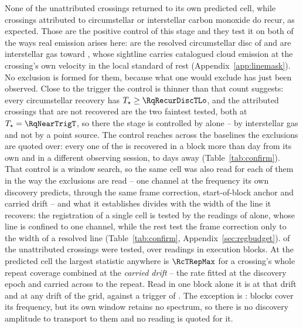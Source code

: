 None of the unattributed crossings returned to its own predicted cell, while
\MkAttrRecur{} crossings attributed to circumstellar or interstellar carbon
monoxide do recur, as expected. Those \MkAttrRecur{} are the positive control of this stage and they
test it on both of the ways real emission arises here: \RqNRecurDisc{} are the
resolved circumstellar disc of \RqRecurDiscStars{} and \RqNRecurCloud{} are
interstellar gas toward \RqRecurCloudStars, whose sightline carries catalogued
cloud emission at the crossing's own velocity in the local standard of rest
(Appendix~\ref{app:linemask}). No exclusion is formed for them, because what
one would exclude has just been observed. Close to the trigger the control is
thinner than that count suggests: every circumstellar recovery has
$T_\star\ge\RqRecurDiscTLo$, and the \RqNearTrigN{} attributed crossings that
are not recovered are the two faintest tested, both at
$T_\star=\RqNearTrigT$, so there the stage is controlled by
\RqRecurCloudStars{} alone -- by interstellar gas and not by a point
source. The control reaches across the baselines the exclusions are quoted
over: every one of the \QcNCtl{} is recovered in a block more than \EpSep{}
day from its own and in a different observing session, \QcSepMinD{} to
\QcSepMaxD{} days away (Table~\ref{tab:confirm}).
That control is a window search, so the same cell was also read for each of
them in the way the exclusions are read -- one channel at the frequency its
own discovery predicts, through the same frame correction, start-of-block
anchor and carried drift -- and what it establishes divides with the width of
the line it recovers: the registration of a single cell is tested by the
\RgRegNUnres{} readings of \RgRegStar{} alone, whose line is confined to one
channel, while the rest test the frame correction only to the width of a
resolved line (Table~\ref{tab:confirm}, Appendix~\ref{sec:regbudget}). \RcNExclPoss{} of the \RcNTested{} unattributed crossings were tested,
over \RcNRepeatMeas{} readings in \RcNRepeatBlock{} execution blocks. At the
predicted cell the largest statistic anywhere is $\RcTRepMax$ for a crossing's
whole repeat coverage combined at the \emph{carried drift} -- the rate fitted
at the discovery epoch and carried across to the repeat. Read in one block
alone it is \RcTMatched{} at that drift and \RcTMax{} at any drift of the
grid, against a trigger of \StageNullTrig. The exception is \RcUntStar{} \texttt{\RcUntEb}:
\RcUntNRep{} blocks cover its frequency, but its own window retains no
spectrum, so there is no discovery amplitude to transport to them and no
reading is quoted for it.

